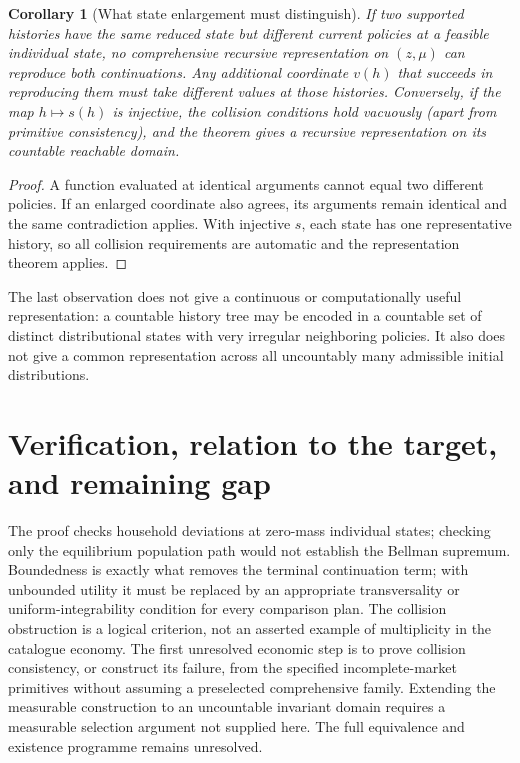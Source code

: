 \documentclass[11pt]{article}
\newtheorem{corollary}[theorem]{Corollary}
\theoremstyle{remark}
\begin{document}
\begin{corollary}[What state enlargement must distinguish]
If two supported histories have the same reduced state but different
current policies at a feasible individual state, no comprehensive
recursive representation on $(z,\mu)$ can reproduce both continuations.
Any additional coordinate $v(h)$ that succeeds in reproducing them must
take different values at those histories. Conversely, if the map
$h\mapsto s(h)$ is injective, the collision conditions hold vacuously
(apart from primitive consistency), and the theorem gives a recursive
representation on its countable reachable domain.
\end{corollary}
\begin{proof}
A function evaluated at identical arguments cannot equal two different
policies. If an enlarged coordinate also agrees, its arguments remain
identical and the same contradiction applies. With injective $s$, each
state has one representative history, so all collision requirements are
automatic and the representation theorem applies.
\end{proof}

The last observation does not give a continuous or computationally useful
representation: a countable history tree may be encoded in a countable
set of distinct distributional states with very irregular neighboring
policies. It also does not give a common representation across all
uncountably many admissible initial distributions.

\section{Verification, relation to the target, and remaining gap}
The proof checks household deviations at zero-mass individual states;
checking only the equilibrium population path would not establish the
Bellman supremum. Boundedness is exactly what removes the terminal
continuation term; with unbounded utility it must be replaced by an
appropriate transversality or uniform-integrability condition for every
comparison plan. The collision obstruction is a logical criterion, not
an asserted example of multiplicity in the catalogue economy.
The first unresolved economic step is to prove collision consistency,
or construct its failure, from the specified incomplete-market primitives
without assuming a preselected comprehensive family. Extending the
measurable construction to an uncountable invariant domain requires a
measurable selection argument not supplied here. The full equivalence
and existence programme remains unresolved.
\end{document}
